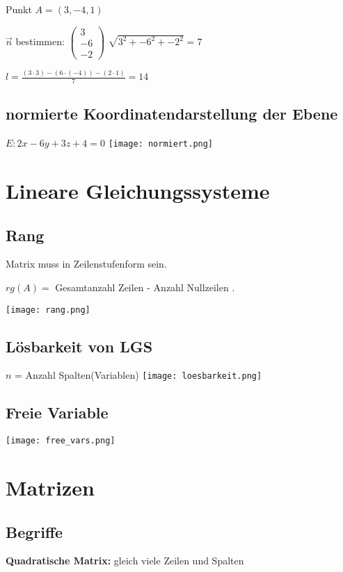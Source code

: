 \begin{multicols*}{3}
    {Punkt $A = (3,-4,1)$}


    { $\vec{n}$ bestimmen: $\begin{pmatrix}
                3  \\
                -6 \\
                -2
            \end{pmatrix}$ $\sqrt{3^2+-6^2+-2^2} = 7$}

    { $l = \frac{(3 \cdot 3) -(6 \cdot (-4)) - (2 \cdot 1)}{7} = 14$}
    \WhiteSpace


    \subsection{  normierte Koordinatendarstellung der Ebene}
    {$E: 2x - 6y +3z + 4 = 0$}
    \texttt{[image: normiert.png]}

   
    \section{Lineare Gleichungssysteme}
    \WhiteSpace
    \subsection{Rang}
    {Matrix muss in Zeilenstufenform sein.}

    {$rg(A) = $ Gesamtanzahl Zeilen - Anzahl Nullzeilen .}

    \texttt{[image: rang.png]}

    \subsection{Lösbarkeit von LGS}
    {$ n $ = Anzahl Spalten(Variablen)}
    \texttt{[image: loesbarkeit.png]}
    \subsection{Freie Variable}

    \texttt{[image: free\_vars.png]}

    \vfill\null
    \columnbreak
    \section{Matrizen}
    \subsection{Begriffe}
    {\textbf{Quadratische Matrix:} gleich viele Zeilen und Spalten}


\end{multicols*}
